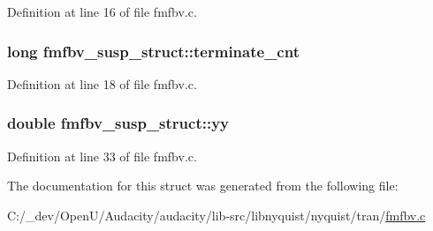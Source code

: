 Definition at line 16 of file fmfbv.\+c.

\subsubsection[{\texorpdfstring{terminate\+\_\+cnt}{terminate_cnt}}]{\setlength{\rightskip}{0pt plus 5cm}long fmfbv\+\_\+susp\+\_\+struct\+::terminate\+\_\+cnt}\hypertarget{structfmfbv__susp__struct_a99e597b41911e4075373587d6f675569}{}\label{structfmfbv__susp__struct_a99e597b41911e4075373587d6f675569}


Definition at line 18 of file fmfbv.\+c.

\subsubsection[{\texorpdfstring{yy}{yy}}]{\setlength{\rightskip}{0pt plus 5cm}double fmfbv\+\_\+susp\+\_\+struct\+::yy}\hypertarget{structfmfbv__susp__struct_ada0725aabc8aedea453ef9aef52ec5bd}{}\label{structfmfbv__susp__struct_ada0725aabc8aedea453ef9aef52ec5bd}


Definition at line 33 of file fmfbv.\+c.



The documentation for this struct was generated from the following file\+:\begin{DoxyCompactItemize}
\item 
C\+:/\+\_\+dev/\+Open\+U/\+Audacity/audacity/lib-\/src/libnyquist/nyquist/tran/\hyperlink{fmfbv_8c}{fmfbv.\+c}\end{DoxyCompactItemize}
